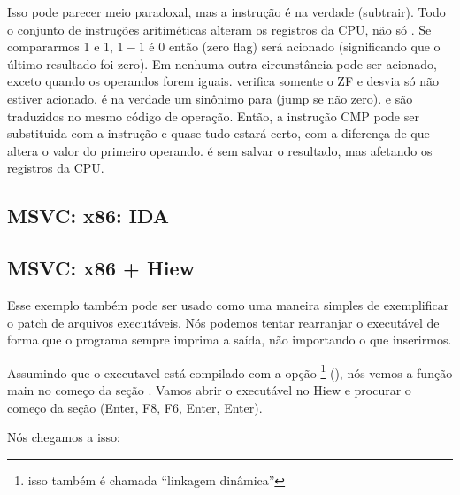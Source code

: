 \label{CMPandSUB}
Isso pode parecer meio paradoxal, mas a instrução \CMP é na verdade \SUB (subtrair).
Todo o conjunto de instruções aritiméticas alteram os registros da \ac{CPU}, não só \CMP.
Se compararmos 1 e 1, $1-1$ é 0 então \ZF (zero flag) será acionado (significando que o último resultado foi zero).
Em nenhuma outra circunstância \ZF pode ser acionado, exceto quando os operandos forem iguais.
\JNE verifica somente o ZF e desvia só não estiver acionado.
\JNE é na verdade um sinônimo para \JNZ (jump se não zero).
\JNE e \JNZ são traduzidos no mesmo código de operação.
Então, a instrução CMP pode ser substituida com a instrução \SUB e quase tudo estará certo, com a diferença de que \SUB altera o valor do primeiro operando.
\CMP é \SUB sem salvar o resultado, mas afetando os registros da \ac{CPU}.

\subsection{MSVC: x86: IDA}

\PTBRph{}

\ifdefined\IncludeOlly
\fi

\clearpage
\subsection{MSVC: x86 + Hiew}

Esse exemplo também pode ser usado como uma maneira simples de exemplificar o patch de arquivos executáveis.
Nós podemos tentar rearranjar o executável de forma que o programa sempre imprima a saída, não importando o que inserirmos.

Assumindo que o executavel está compilado com a opção \footnote{isso também é chamada ``linkagem dinâmica''}
(), nós vemos a função main no começo da seção .
Vamos abrir o executável no Hiew e procurar o começo da seção  (Enter, F8, F6, Enter, Enter).

Nós chegamos a isso:

